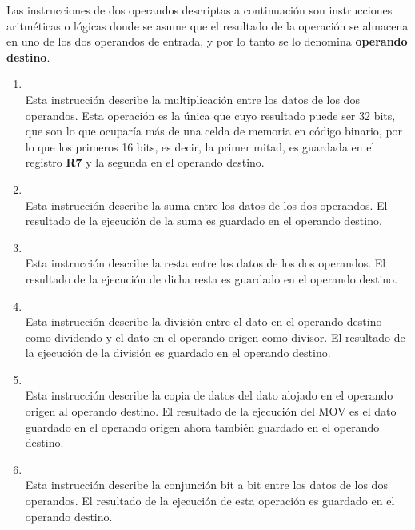 

Las instrucciones de dos operandos descriptas a continuación son instrucciones aritméticas o lógicas donde se asume que el resultado de la operación se almacena en uno de los dos operandos de entrada, y por lo tanto se lo denomina \textbf{operando destino}.

\begin{enumerate}
\item  {}\\
Esta instrucción describe la multiplicación entre los datos de los dos operandos. Esta operación es la única que cuyo resultado puede ser 32 bits, que son lo que ocuparía más de una celda de memoria en código binario, por lo que los primeros 16 bits, es decir, la primer mitad, es guardada en el registro \textbf{R7} y la segunda en el operando destino.
 
\item  {}\\
Esta instrucción describe la suma entre los datos de los dos operandos. El resultado de la ejecución de la suma es guardado en el operando destino.

\item  {}\\
Esta instrucción describe la resta entre los datos de los dos operandos. El resultado de la ejecución de dicha resta es guardado en el operando destino.

\item  {}\\
Esta instrucción describe la división entre el dato en el operando destino como dividendo y el dato en el operando origen como divisor. El resultado de la ejecución de la división es guardado en el operando destino.

\item  {}\\
Esta instrucción describe la copia de datos del dato alojado en el operando origen al operando destino. El resultado de la ejecución del MOV es el dato guardado en el operando origen ahora también guardado en el operando destino.

\item  {}\\
Esta instrucción describe la conjunción bit a bit entre los datos de los dos operandos. El resultado de la ejecución de esta operación es guardado en el operando destino.


\end{enumerate}
